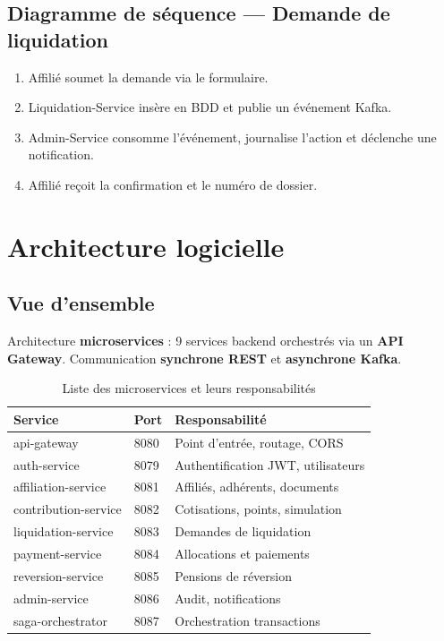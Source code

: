 \documentclass[12pt,a4paper,oneside]{report}
\begin{document}
\subsection{Diagramme de séquence --- Demande de liquidation}
\begin{enumerate}
    \item Affilié soumet la demande via le formulaire.
    \item Liquidation-Service insère en BDD et publie un événement Kafka.
    \item Admin-Service consomme l'événement, journalise l'action et déclenche une notification.
    \item Affilié reçoit la confirmation et le numéro de dossier.
\end{enumerate}

\section{Architecture logicielle}

\subsection{Vue d'ensemble}
Architecture \textbf{microservices} : 9 services backend orchestrés via un \textbf{API Gateway}. Communication \textbf{synchrone REST} et \textbf{asynchrone Kafka}.

\begin{table}[H]
\centering
\caption{Liste des microservices et leurs responsabilités}
\begin{tabular}{lll}
\toprule
\textbf{Service} & \textbf{Port} & \textbf{Responsabilité} \\
\midrule
api-gateway & 8080 & Point d'entrée, routage, CORS \\
auth-service & 8079 & Authentification JWT, utilisateurs \\
affiliation-service & 8081 & Affiliés, adhérents, documents \\
contribution-service & 8082 & Cotisations, points, simulation \\
liquidation-service & 8083 & Demandes de liquidation \\
payment-service & 8084 & Allocations et paiements \\
reversion-service & 8085 & Pensions de réversion \\
admin-service & 8086 & Audit, notifications \\
saga-orchestrator & 8087 & Orchestration transactions \\
\bottomrule
\end{tabular}
\end{table}
\end{document}
